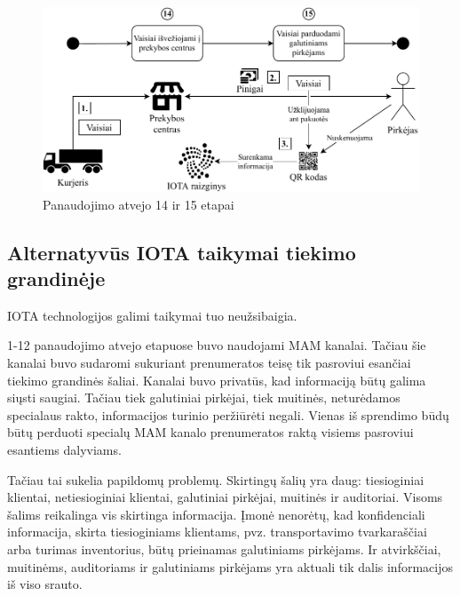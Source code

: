 \begin{figure}[H]
    \centering
    \includegraphics[scale=0.8]{images/iota-usecase-14-15}
    \caption{Panaudojimo atvejo 14 ir 15 etapai}
\end{figure}




\subsection{Alternatyvūs IOTA taikymai tiekimo grandinėje}

IOTA technologijos galimi taikymai tuo neužsibaigia.

1-12 panaudojimo atvejo etapuose buvo naudojami MAM kanalai. Tačiau šie kanalai buvo sudaromi sukuriant prenumeratos teisę tik pasroviui esančiai tiekimo grandinės šaliai. Kanalai buvo privatūs, kad informaciją būtų galima siųsti saugiai. Tačiau tiek galutiniai pirkėjai, tiek muitinės, neturėdamos specialaus rakto, informacijos turinio peržiūrėti negali. Vienas iš sprendimo būdų būtų perduoti specialų MAM kanalo prenumeratos raktą visiems pasroviui esantiems dalyviams.

Tačiau tai sukelia papildomų problemų. Skirtingų šalių yra daug: tiesioginiai klientai, netiesioginiai klientai, galutiniai pirkėjai, muitinės ir auditoriai. Visoms šalims reikalinga vis skirtinga informacija. Įmonė nenorėtų, kad konfidenciali informacija, skirta tiesioginiams klientams, pvz. transportavimo tvarkaraščiai arba turimas inventorius, būtų prieinamas galutiniams pirkėjams. Ir atvirkščiai, muitinėms, auditoriams ir galutiniams pirkėjams yra aktuali tik dalis informacijos iš viso srauto.

